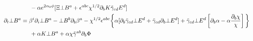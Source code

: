 \documentclass[%
 reprint,
 amsmath,amssymb,
 aps,
]{revtex4-1}
\begin{document}
\begin{widetext}
\begin{align}
			    & \indent - \alpha e^{2 \alpha_0 \phi} [ \Xi \bot B^a + \epsilon^{abc} \chi^{1/2} \partial_b K \tilde{\gamma}_{cd} E^d] \\
\partial_t \bot B^a &= \beta^i \partial_i \bot B^a - \bot B^b \partial_b \beta^a - \chi^{1/2} \epsilon^{abc} \bigg \{ \alpha [\partial_b \tilde{\gamma}_{cd} \bot E^d + \tilde{\gamma}_{cd} \partial_b \bot E^d] + \tilde{\gamma}_{cd} \bot E^d \left[ \partial_b \alpha - \alpha \frac{\partial_b \chi}{\chi} \right] \bigg \} \nonumber \\
			    & \indent + \alpha K \bot B^a + \alpha \chi \tilde{\gamma}^{ab} \partial_b \Phi
\end{align}
\end{widetext}
\end{document}
